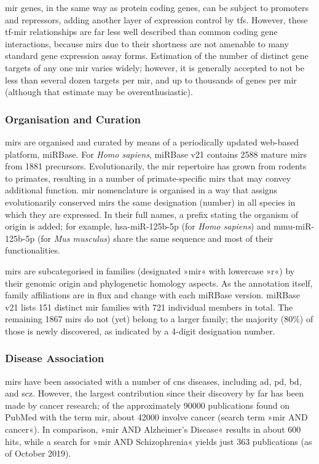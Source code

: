\ac{mir} genes, in the same way as protein coding genes, can be subject to promoters and repressors, adding another layer of expression control by \acp{tf}. However, these \ac{tf}-\ac{mir} relationships are far less well described than common coding gene interactions, because \acp{mir} due to their shortness are not amenable to many standard gene expression assay forms. Estimation of the number of distinct gene targets of any one \ac{mir} varies widely; however, it is generally accepted to not be less than several dozen targets per \ac{mir}, and up to thousands of genes per \ac{mir} (although that estimate may be overenthusiastic).\cite{Hendrickson2009, Zhdanov2009}

\subsubsection{Organisation and Curation}
\acp{mir} are organised and curated by means of a periodically updated web-based platform, miRBase.\cite{Kozomara2019} For \textit{Homo sapiens}, miRBase v21 contains 2588 mature \acp{mir} from 1881 precursors. Evolutionarily, the \ac{mir} repertoire has grown from rodents to primates, resulting in a number of primate-specific \acp{mir} that may convey additional function. \ac{mir} nomenclature is organised\cite{Ambros2003} in a way that assigns evolutionarily conserved \acp{mir} the same designation (number) in all species in which they are expressed. In their full names, a prefix stating the organism of origin is added; for example, hsa-miR-125b-5p (for \textit{Homo sapiens}) and mmu-miR-125b-5p (for \textit{Mus musculus}) share the same sequence and most of their functionalities.

\acp{mir} are subcategorised in families (designated »mir« with lowercase »r«) by their genomic origin and phylogenetic homology aspects. As the annotation itself, family affiliations are in flux and change with each miRBase version. miRBase v21 lists 151 distinct \ac{mir} families with 721 individual members in total. The remaining 1867 \acp{mir} do not (yet) belong to a larger family; the majority (80\%) of those is newly discovered, as indicated by a 4-digit designation number.

\subsubsection{Disease Association}
\acp{mir} have been associated with a number of \ac{cns} diseases, including \ac{ad}, \ac{pd}, \ac{bd}, and \ac{scz}. However, the largest contribution since their discovery by far has been made by cancer research; of the approximately \num{90000} publications found on PubMed with the term \ac{mir}, about \num{42000} involve cancer (search term »\ac{mir} AND cancer«). In comparison, »\ac{mir} AND Alzheimer's Disease« results in about 600 hits, while a search for »\ac{mir} AND Schizophrenia« yields just 363 publications (as of October 2019).

